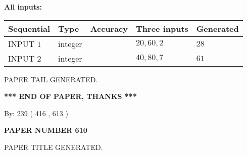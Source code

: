 \documentclass[12pt]{article}
\begin{document}
   
   
   
\noindent\vspace{0.1in}\hspace{-0.08in} {\textbf{\Large{All inputs: }}}
   
   
  
  
\noindent\begin{tabular}{|l|l|l|l|l|}
\hline
 Sequential & Type & Accuracy & Three inputs & Generated \\ 
\hline
 
 
  INPUT $  1 $ & integer &  & $
 20
 , 
 60
 , 
 2
 $ & $ 28 $ 
 \\  \hline  
 
 
  INPUT $  2 $ & integer &  & $
 40
 , 
 80
 , 
 7
 $ & $ 61 $ 
 \\  \hline  
 \end{tabular}
   
   
   
   
   
   
 \vspace{0.2in}
 
   
   
\vspace{2.0in} PAPER TAIL GENERATED.
   
   
   
   
\vspace{1.0in} 
{\textbf{\large{ *** END OF PAPER, THANKS *** }}} 
   
   
\hspace{1.0in} By: 
 239 ( 416 ,  613 )
   
   
   
   
\newpage 
\setcounter{page}{ 
   610001 } 
   
   
   
   
 {\textbf{ \Large{ PAPER NUMBER  610  }}}
   
   
\vspace{0.2in}
   
   
   
   
   
   
   
   
 \vspace{0.2in}
 
 
 
 
   
   
 PAPER TITLE GENERATED.
   
   
   
\vspace{0.2in}
   
\end{document}
